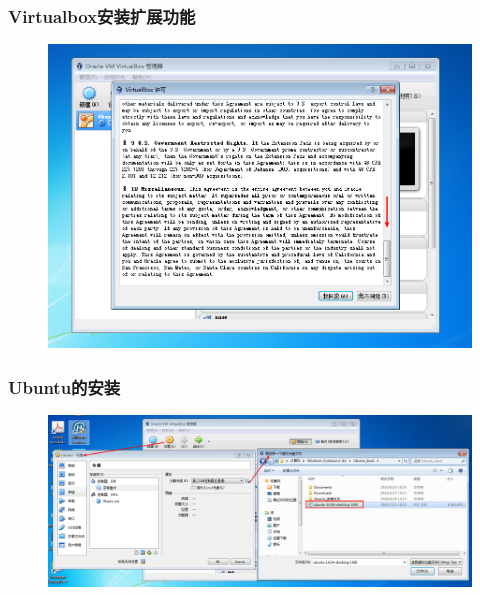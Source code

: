 \frame
{
	\frametitle{\textrm{Virtualbox}安装扩展功能}
\begin{figure}[h!]
\centering
\vspace{-5.5pt}
\includegraphics[height=0.62\textwidth]{Figures/Virtualbox-install-9.png}
\caption{\textrm{\fontsize{6.2pt}{5.2pt}\selectfont{The install step-6 of Virtualbox.}}}
\label{Virtualbox-install-6}
\end{figure}
}

\frame
{
	\frametitle{\textrm{Ubuntu}的安装}
\begin{figure}[h!]
\centering
\vspace{17.5pt}
\includegraphics[height=0.41\textwidth]{Figures/Virtualbox-ubuntu-install-0.png}
\caption{\textrm{\fontsize{6.2pt}{5.2pt}\selectfont{The install step-1 of Ubuntu in Virtualbox.}}}
\label{Virtualbox-ubuntu-install-0}
\end{figure}
}

